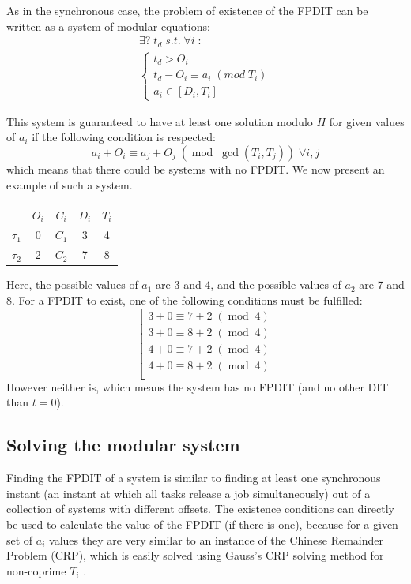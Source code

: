 \documentclass[conference]{IEEEtran}
\begin{document}
		As in the synchronous case, the problem of existence of the FPDIT
		can be written as a system of modular equations:
		\[
			\begin{array}{l}
				\exists ? \; t_d \; s.t. \; \forall i \; :\\
				\left\{
					\begin{array}{l}
						t_d > O_i \\
						t_d - O_i \equiv a_i \; (mod \; T_i) \\
						a_i \in [D_i, T_i]
					\end{array}
				\right.
			\end{array}
		\]

		This system is guaranteed to have at least one solution modulo $H$ for given
		values of $a_i$ if the following condition is respected:
		\[
			a_i + O_i \equiv a_j + O_j \; (\operatorname{mod} \; \operatorname{gcd}(T_i,
			T_j)) \; \forall i,j
		\]
		which means that there could be systems with no FPDIT.
		We now present an example of such a system.\\

		\begin{center}
			\begin{tabular}{|r|c|c|c|c|}
				\hline
							& $O_i$ & $C_i$ & $D_i$ & $T_i$ \\ \hline
				$\tau_1$ 	& 0 	& $C_1$ & 3 	& 4\\ \hline
				$\tau_2$ 	& 2 	& $C_2$ & 7 	& 8\\ \hline
			\end{tabular}
		\end{center}

		Here, the possible values of $a_1$ are 3 and 4, and the possible values
		of $a_2$ are 7 and 8. For a FPDIT to exist, one of the following
		conditions must be fulfilled:
		\[
			\left[
			\begin{array}{c}
				3 + 0 \equiv 7 + 2 \; (\operatorname{mod} \; 4 ) \\
				3 + 0 \equiv 8 + 2 \; (\operatorname{mod} \; 4 ) \\
				4 + 0 \equiv 7 + 2 \; (\operatorname{mod} \; 4 ) \\
				4 + 0 \equiv 8 + 2 \; (\operatorname{mod} \; 4 ) \\
			\end{array}
			\right.
		\]
		However neither is, which means the system has
		no FPDIT (and no other DIT than $t=0$).

	\subsection{Solving the modular system}
		Finding the FPDIT of a system is similar to finding at least one synchronous
		instant (an instant at which all tasks release a job simultaneously) out of a
		collection of systems with different offsets. The existence conditions can
		directly be used to calculate the value of the FPDIT (if there is one),
		because for a given set of $a_i$ values they are very similar to an instance
		of the Chinese Remainder Problem (CRP), which is easily solved using Gauss's
		CRP solving method for non-coprime $T_i$ \cite{gauss1965disquisitiones}.
\end{document}
